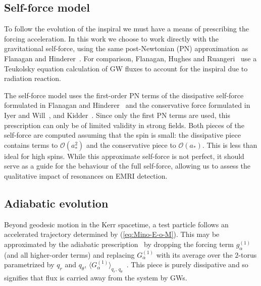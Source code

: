 \documentclass[aps,prd,amsfonts,amssymb,amsmath,nofootinbib,reprint,showpacs,superscriptaddress,twocolumn]{revtex4}
\newcommand{\eqnref}[1]{(\ref{eq:#1})}
\newcommand{\order}[1]{\ensuremath{\mathcal{O}({#1})}}
\begin{document}
\subsection{Self-force model}
\label{sec:self-force}

To follow the evolution of the inspiral we must have a means of prescribing the forcing acceleration. In this work we choose to work directly with the gravitational self-force, using the same post-Newtonian (PN) approximation as Flanagan and Hinderer~\cite{Flanagan2012}. For comparison, Flanagan, Hughes and Ruangeri~\cite{Flanagan2012a} use a Teukolsky equation calculation of GW fluxes to account for the inspiral due to radiation reaction.

The self-force model uses the first-order PN terms of the dissipative self-force formulated in Flanagan and Hinderer~\cite{Flanagan2007} and the conservative force formulated in Iyer and Will~\cite{Iyer1993}, and Kidder~\cite{Kidder1995}. Since only the first PN terms are used, this prescription can only be of limited validity in strong fields. Both pieces of the self-force are computed assuming that the spin is small: the dissipative piece contains terms to $\order{a_\ast^2}$ and the conservative piece to $\order{a_\ast}$. This is less than ideal for high spins. While this approximate self-force is not perfect, it should serve as a guide for the behaviour of the full self-force, allowing us to assess the qualitative impact of resonances on EMRI detection.

\subsection{Adiabatic evolution}

Beyond geodesic motion in the Kerr spacetime, a test particle follows an accelerated trajectory determined by \eqnref{Mino-E-o-M}. This may be approximated by the adiabatic prescription~\cite{Hinderer2008} by dropping the forcing term $g_\alpha^{(1)}$ (and all higher-order terms) and replacing $G_\alpha^{(1)}$ with its average over the $2$-torus parametrized by $q_r$ and $q_\theta$, $\langle G_\alpha^{(1)}\rangle_{q_r,\,q_\theta}$~\cite{Drasco2005}. This piece is purely dissipative and so signifies that flux is carried away from the system by GWs.
\end{document}
